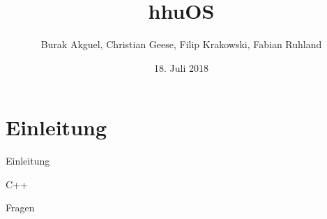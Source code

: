 \documentclass[german,aspectratio=169]{beamer}
\title{hhuOS}
\date{18. Juli 2018}
\author{Burak Akguel, Christian Geese, Filip Krakowski, Fabian Ruhland}
\institute{Institut für Informatik \\
	Heinrich-Heine-Universität Düsseldorf}
\begin{document}
	
	\maketitle
	
	\section{Einleitung}
	
	\begin{frame}{Einleitung}
	
		\begin{bpbox}{C++}
		\end{bpbox}
		
	\end{frame}

	\begin{frame}[standout]
			\Large Fragen
	\end{frame}
\end{document}
